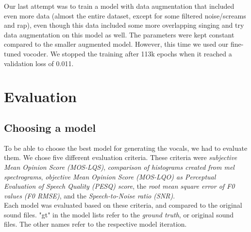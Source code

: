 \documentclass[a4paper]{article}
\begin{document}
	Our last attempt was to train a model with data augmentation that included even more data (almost the entire dataset, except for some filtered noise/screams and rap), even though this data included some more overlapping singing and try data augmentation on this model as well. The parameters were kept constant compared to the smaller augmented model. However, this time we used our fine-tuned vocoder. We stopped the training after 113k epochs when it reached a validation loss of 0.011.
	
	
	\section{Evaluation}
	
	\subsection{Choosing a model}
	
	To be able to choose the best model for generating the vocals, we had to
	evaluate them. We chose five different evaluation criteria. These criteria were
	\emph{subjective Mean Opinion Score (MOS-LQS)}, \emph{comparison of histograms
		created from mel spectrograms}, \emph{objective Mean Opinion Score (MOS-LQO) as
		Perceptual Evaluation of Speech Quality (PESQ) score}, the \emph{root mean
		square error of F0 values (F0 RMSE)}, and the \emph{Speech-to-Noise ratio
		(SNR)}. \\
	Each model was evaluated based on these criteria, and compared to the original
	sound files. "gt" in the model lists refer to the \emph{ground truth}, or
	original sound files. The other names refer to the respective model iteration.
	
\end{document}
